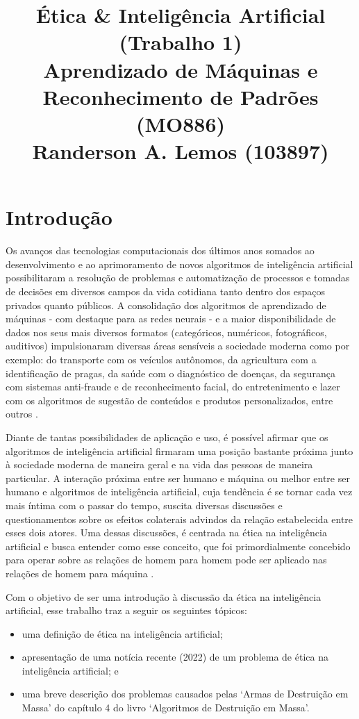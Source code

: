 \documentclass{article}
\title{
	Ética \& Inteligência Artificial (Trabalho 1) \\
	\Large Aprendizado de Máquinas e Reconhecimento de Padrões (MO886) \\
	Randerson A. Lemos (103897)
}
\date{\vspace{-5ex}}
\begin{document}
  \maketitle

%
\section*{Introdução}
Os avanços das tecnologias computacionais dos últimos anos somados ao desenvolvimento e ao aprimoramento de novos algoritmos de inteligência artificial possibilitaram a resolução de problemas e automatização de processos e tomadas de decisões em diversos campos da vida cotidiana tanto dentro dos espaços privados quanto públicos. A consolidação dos algoritmos de aprendizado de máquinas - com destaque para as redes neurais - e a maior disponibilidade de dados nos seus mais diversos formatos (categóricos, numéricos, fotográficos, auditivos) impulsionaram diversas áreas sensíveis a sociedade moderna como por exemplo: do transporte com os veículos autônomos, da agricultura com a identificação de pragas, da saúde com o diagnóstico de doenças, da segurança com sistemas anti-fraude e de reconhecimento facial, do entretenimento e lazer com os algoritmos de sugestão de conteúdos e produtos personalizados, entre outros \cite{Ludermir_2021}.

Diante de tantas possibilidades de aplicação e uso, é possível afirmar que os algoritmos de inteligência artificial firmaram uma posição bastante próxima junto à sociedade moderna de maneira geral e na vida das pessoas de maneira particular. A interação próxima entre ser humano e máquina ou melhor entre ser humano e algoritmos de inteligência artificial, cuja tendência é se tornar cada vez mais íntima com o passar do tempo, suscita diversas discussões e questionamentos sobre os efeitos colaterais advindos da relação estabelecida entre esses dois atores. Uma dessas discussões, é centrada na ética na inteligência artificial e busca entender como esse conceito, que foi primordialmente concebido para operar sobre as relações de homem para homem pode ser aplicado nas relações de homem para máquina \cite{Ludermir_2021}. 

Com o objetivo de ser uma introdução à discussão da ética na inteligência artificial, esse trabalho traz a seguir os seguintes tópicos:
\begin{itemize}
	\item uma definição de ética na inteligência artificial;
	\item apresentação de uma notícia recente (2022) de um problema de ética na inteligência artificial; e
	\item uma breve descrição dos problemas causados pelas `Armas de Destruição em Massa' do capítulo 4 do livro `Algoritmos de Destruição em Massa'.
\end{itemize}
\end{document}
